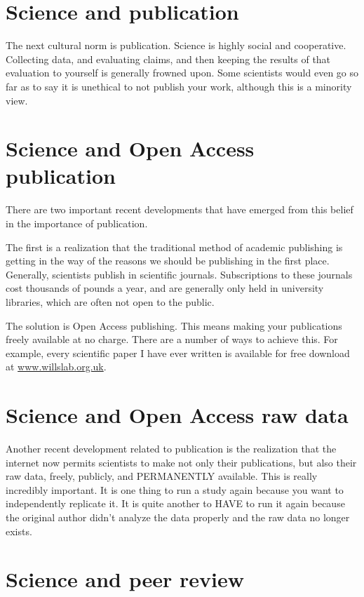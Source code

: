 \documentclass[12pt]{article}
\begin{document}
\section{Science and publication}

The next cultural norm is publication. Science is highly social and
cooperative. Collecting data, and evaluating claims, and then keeping
the results of that evaluation to yourself is generally frowned
upon. Some scientists would even go so far as to say it is unethical
to not publish your work, although this is a minority view.

\section{Science and Open Access publication}

There are two important recent developments that have emerged from
this belief in the importance of publication.

The first is a realization that the traditional method of academic
publishing is getting in the way of the reasons we should be
publishing in the first place. Generally, scientists publish in
scientific journals. Subscriptions to these journals cost thousands of
pounds a year, and are generally only held in university libraries,
which are often not open to the public.

The solution is Open Access publishing. This means making your
publications freely available at no charge. There are a number of ways
to achieve this. For example, every scientific paper I have ever
written is available for free download at \url{www.willslab.org.uk}.

\section{Science and Open Access raw data}

Another recent development related to publication is the realization
that the internet now permits scientists to make not only their
publications, but also their raw data, freely, publicly, and
PERMANENTLY available. This is really incredibly important. It is one
thing to run a study again because you want to independently replicate
it. It is quite another to HAVE to run it again because the original
author didn't analyze the data properly and the raw data no longer
exists.

\section{Science and peer review}
\end{document}
